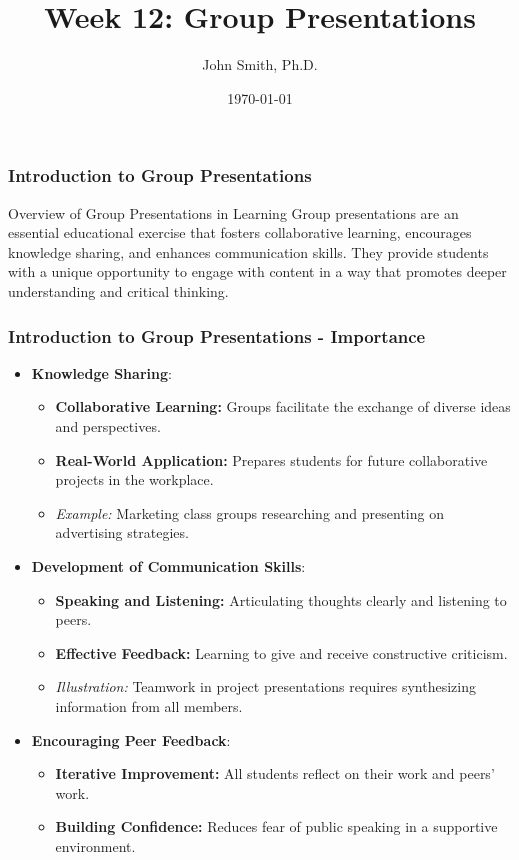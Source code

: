 \documentclass[aspectratio=169]{beamer}
\title[Week 12: Group Presentations]{Week 12: Group Presentations}
\author[J. Smith]{John Smith, Ph.D.}
\institute[University Name]{
  Department of Computer Science\\
  University Name\\
  Email: email@university.edu\\
  Website: www.university.edu
}
\date{\today}
\begin{document}
\frame{\titlepage}

\begin{frame}[fragile]
    \frametitle{Introduction to Group Presentations}
    \begin{block}{Overview of Group Presentations in Learning}
        Group presentations are an essential educational exercise that fosters collaborative learning, encourages knowledge sharing, and enhances communication skills. They provide students with a unique opportunity to engage with content in a way that promotes deeper understanding and critical thinking.
    \end{block}
\end{frame}

\begin{frame}[fragile]
    \frametitle{Introduction to Group Presentations - Importance}
    \begin{itemize}
        \item \textbf{Knowledge Sharing}:
          \begin{itemize}
              \item \textbf{Collaborative Learning:} Groups facilitate the exchange of diverse ideas and perspectives.
              \item \textbf{Real-World Application:} Prepares students for future collaborative projects in the workplace.
              \item \textit{Example:} Marketing class groups researching and presenting on advertising strategies.
          \end{itemize}
          
        \item \textbf{Development of Communication Skills}:
          \begin{itemize}
              \item \textbf{Speaking and Listening:} Articulating thoughts clearly and listening to peers.
              \item \textbf{Effective Feedback:} Learning to give and receive constructive criticism.
              \item \textit{Illustration:} Teamwork in project presentations requires synthesizing information from all members.
          \end{itemize}
          
        \item \textbf{Encouraging Peer Feedback}:
          \begin{itemize}
              \item \textbf{Iterative Improvement:} All students reflect on their work and peers' work.
              \item \textbf{Building Confidence:} Reduces fear of public speaking in a supportive environment.
          \end{itemize}
    \end{itemize}
\end{frame}
\end{document}
